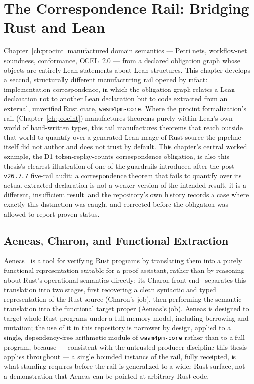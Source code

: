 \chapter{The Correspondence Rail: Bridging Rust and Lean}
\label{ch:correspondence}

Chapter~\ref{ch:procint} manufactured domain semantics --- Petri nets,
workflow-net soundness, conformance, OCEL~2.0 --- from a declared
obligation graph whose objects are entirely Lean statements about Lean
structures. This chapter develops a second, structurally different
manufacturing rail opened by \textsf{mfact}: implementation
correspondence, in which the obligation graph relates a Lean declaration
not to another Lean declaration but to code extracted from an external,
unverified Rust crate, \texttt{wasm4pm-core}. Where the procint
formalization's rail (Chapter~\ref{ch:procint}) manufactures theorems
purely within Lean's own world of hand-written
types, this rail manufactures theorems that reach outside that world to
quantify over a generated Lean image of Rust source the pipeline itself
did not author and does not trust by default. This chapter's central
worked example, the D1 token-replay-counts correspondence obligation, is
also this thesis's clearest illustration of one of the guardrails
introduced after the post-\texttt{v26.7.7} five-rail audit: a
correspondence theorem that fails to quantify over its actual extracted
declaration is not a weaker version of the intended result, it is a
different, insufficient result, and the repository's own history records
a case where exactly this distinction was caught and corrected before the
obligation was allowed to report proven status.

\section{Aeneas, Charon, and Functional Extraction}
\label{sec:correspondence-aeneas}

Aeneas~\cite{ho2022aeneas} is a tool for verifying Rust programs by
translating them into a purely functional representation suitable for a
proof assistant, rather than by reasoning about Rust's operational
semantics directly; its Charon front end~\cite{protzenko2024charon}
separates this translation into two stages, first recovering a clean
syntactic and typed representation of the Rust source (Charon's job),
then performing the semantic translation into the functional target
proper (Aeneas's job). Aeneas is designed to target whole Rust programs
under a full memory model, including borrowing and mutation; the use of
it in this repository is narrower by design, applied to a single,
dependency-free arithmetic module of \texttt{wasm4pm-core} rather than to
a full program, because --- consistent with the untrusted-producer
discipline this thesis applies throughout --- a single bounded instance
of the rail, fully receipted, is what standing requires before the rail
is generalized to a wider Rust surface, not a demonstration that Aeneas
can be pointed at arbitrary Rust code.

